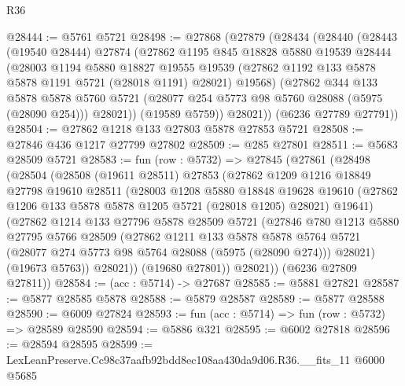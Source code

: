 \begin{lexlean}{R36}
\begin{coremodule}
@28444 := @5761 @5721
@28498 := @27868
    (@27879
      (@28434
        (@28440
          (@28443
            (@19540 @28444)
            @27874
            (@27862
              @1195
              @845
              @18828
              @5880
              @19539
              @28444
              (@28003
                @1194
                @5880
                @18827
                @19555
                @19539
                (@27862 @1192 @133 @5878 @5878 @1191 @5721 (@28018 @1191) @28021)
                @19568)
              (@27862
                @344
                @133
                @5878
                @5878
                @5760
                @5721
                (@28077 @254 @5773 @98 @5760 @28088 (@5975 (@28090 @254)))
                @28021))
            (@19589 @5759))
          @28021))
      (@6236 @27789 @27791))
@28504 := @27862 @1218 @133 @27803 @5878 @27853 @5721
@28508 := @27846 @436 @1217 @27799 @27802
@28509 := @285 @27801
@28511 := @5683 @28509 @5721
@28583 := fun (row : @5732) =>
  @27845
    (@27861
      (@28498
        (@28504
          (@28508
            (@19611 @28511)
            @27853
            (@27862
              @1209
              @1216
              @18849
              @27798
              @19610
              @28511
              (@28003
                @1208
                @5880
                @18848
                @19628
                @19610
                (@27862 @1206 @133 @5878 @5878 @1205 @5721 (@28018 @1205) @28021)
                @19641)
              (@27862
                @1214
                @133
                @27796
                @5878
                @28509
                @5721
                (@27846
                  @780
                  @1213
                  @5880
                  @27795
                  @5766
                  @28509
                  (@27862
                    @1211
                    @133
                    @5878
                    @5878
                    @5764
                    @5721
                    (@28077 @274 @5773 @98 @5764 @28088 (@5975 (@28090 @274)))
                    @28021)
                  (@19673 @5763))
                @28021))
            (@19680 @27801))
          @28021))
      (@6236 @27809 @27811))
@28584 := (acc : @5714) -> @27687
@28585 := @5881 @27821
@28587 := @5877 @28585 @5878
@28588 := @5879 @28587
@28589 := @5877 @28588
@28590 := @6009 @27824
@28593 := fun (acc : @5714) => fun (row : @5732) => @28589 @28590
@28594 := @5886 @321
@28595 := @6002 @27818
@28596 := @28594 @28595
@28599 := LexLeanPreserve.Cc98c37aafb92bdd8ec108aa430da9d06.R36.__fits_11 @6000 @5685

\end{coremodule}
\end{lexlean}
